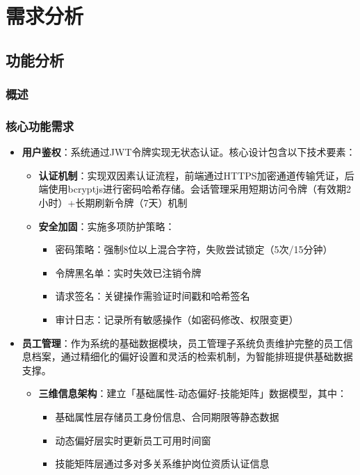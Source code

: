 \documentclass{ctexart}
\begin{document}
\section{需求分析}
\subsection{功能分析}
\subsubsection{概述}

\subsubsection{核心功能需求}
\begin{itemize}
    \item \textbf{用户鉴权}：系统通过JWT令牌实现无状态认证。核心设计包含以下技术要素：
    \begin{itemize}
        \item \textbf{认证机制}：实现双因素认证流程，前端通过HTTPS加密通道传输凭证，后端使用bcryptjs进行密码哈希存储。会话管理采用短期访问令牌（有效期2小时）+长期刷新令牌（7天）机制
        
        \item \textbf{安全加固}：实施多项防护策略：
        \begin{itemize}
            \item 密码策略：强制8位以上混合字符，失败尝试锁定（5次/15分钟）
            \item 令牌黑名单：实时失效已注销令牌
            \item 请求签名：关键操作需验证时间戳和哈希签名
            \item 审计日志：记录所有敏感操作（如密码修改、权限变更）
        \end{itemize}
    \end{itemize}

    \item \textbf{员工管理}：作为系统的基础数据模块，员工管理子系统负责维护完整的员工信息档案，通过精细化的偏好设置和灵活的检索机制，为智能排班提供基础数据支撑。
    \begin{itemize}
        \item \textbf{三维信息架构}：建立「基础属性-动态偏好-技能矩阵」数据模型，其中：
            \begin{itemize}
                \item 基础属性层存储员工身份信息、合同期限等静态数据
                \item 动态偏好层实时更新员工可用时间窗
                \item 技能矩阵层通过多对多关系维护岗位资质认证信息
            \end{itemize}
        

\end{itemize}
\end{itemize}
\end{document}
